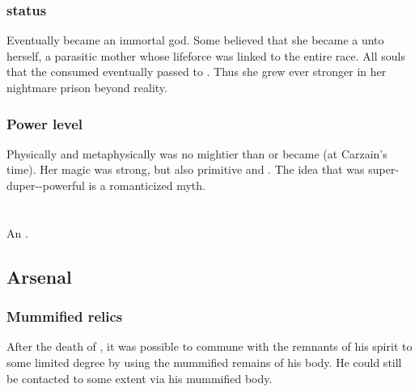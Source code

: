 \subsubsection{\Dweomer status}
Eventually \Tiamat became an immortal god. 
Some believed that she became a \dweomer unto herself, a parasitic mother whose lifeforce was linked to the entire \draconian race. 
All souls that the \dragons consumed eventually passed to \Tiamat.
Thus she grew ever stronger in her nightmare prison beyond reality. 





\subsubsection{Power level}
Physically and metaphysically \Kserasshana{} was no mightier than \Secherdamon{} or \Ishnaruchaefir{} became (at Carzain's time). 
Her magic was strong, but also primitive and \naive. 
The idea that \Kserasshana{} was super-duper-\uber-powerful is a romanticized myth. 















\section{\ValcanSethicus}
\index{\Sethicus}
An \ophidian. 









\subsection{Arsenal}





\subsubsection{Mummified relics}
After the death of \Sethicus, it was possible to commune with the remnants of his spirit to some limited degree by using the mummified remains of his body. 
He could still be contacted to some extent via his mummified body.





